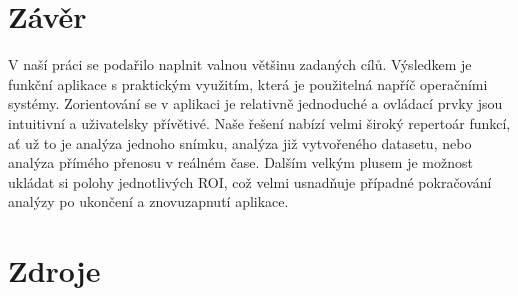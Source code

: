 \documentclass[a4paper,11pt]{article}
\begin{document}
\newpage

\section{Závěr}
V naší práci se podařilo naplnit valnou většinu zadaných cílů. Výsledkem je funkční aplikace s praktickým využitím, která je použitelná napříč operačními systémy. Zorientování se v aplikaci je relativně jednoduché a ovládací prvky jsou intuitivní a uživatelsky přívětivé. Naše řešení nabízí velmi široký repertoár funkcí, ať už to je analýza jednoho snímku, analýza již vytvořeného datasetu, nebo analýza přímého přenosu v reálném čase. Dalším velkým plusem je možnost ukládat si polohy jednotlivých ROI, což velmi usnadňuje případné pokračování analýzy po ukončení a znovuzapnutí aplikace.

\newpage

\section{Zdroje}
\nocite{*}

\printbibliography
\end{document}

